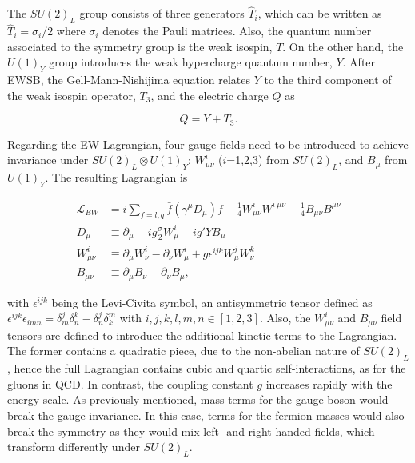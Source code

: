 The $SU(2)_L$ group consists of three generators $\hat{T}_i$, which can be written as $\hat{T}_i=\sigma_i/2$ where $\sigma_i$ denotes the Pauli matrices. Also, the quantum number associated to the symmetry group is the weak isospin, $T$.
On the other hand, the $U(1)_Y$ group introduces the weak hypercharge quantum number, $Y$. After \acrshort{EWSB},
the Gell-Mann-Nishijima equation relates $Y$ to the third component of the weak isospin operator, $T_3$, and the electric charge $Q$ as

\begin{equation}
Q = Y+T_3.
\end{equation}

Regarding the \acrshort{EW} Lagrangian, four gauge fields need to be introduced to achieve invariance under $SU(2)_L\otimes U(1)_Y$: $W_{\mu\nu}^i$ ($i$=1,2,3) from $SU(2)_L$, and $B_\mu$ from $U(1)_Y$. The resulting Lagrangian is

\begin{equation}
\label{Theory_eq:EWlagrangian}
\begin{split}
    \mathcal{L}_{EW}&=i\sum_{f=l,q}\bar{f}(\gamma^\mu D_\mu)f - \frac{1}{4}W_{\mu\nu}^iW^{i\ \mu\nu} - \frac{1}{4}B_{\mu\nu}B^{\mu\nu}\\
    D_{\mu \ } &\equiv \partial_\mu - ig\frac{\sigma}{2}W_\mu^i-ig'YB_\mu \\
    W_{\mu\nu}^i &\equiv \partial_\mu W_\nu^i - \partial_\nu W_\mu^i +g\epsilon^{ijk}W_\mu^j W_\nu^k\\
    B_{\mu\nu}&\equiv\partial_\mu B_\nu - \partial_\nu B_\mu,
    \end{split}
\end{equation}

with $\epsilon^{ijk}$ being the Levi-Civita symbol, an antisymmetric tensor defined as $\epsilon^{ijk}\epsilon_{imn}=\delta^j_m\delta^k_n-\delta^j_n\delta^m_k$ with $i,j,k,l,m,n\in[1,2,3]$. Also, the $W_{\mu\nu}^i$ and $B_{\mu\nu}$ field tensors are defined to introduce the additional kinetic terms to the Lagrangian. The former contains a quadratic piece, due to the non-abelian nature of $SU(2)_L$, hence the full Lagrangian contains cubic and quartic self-interactions, as for the gluons in QCD. In contrast, the coupling constant $g$ increases rapidly with the energy scale. As previously mentioned, mass terms for the gauge boson would break the gauge invariance. In this case, terms for the fermion masses would also break the symmetry as they would mix left- and right-handed fields, which transform differently under $SU(2)_L$.\\

